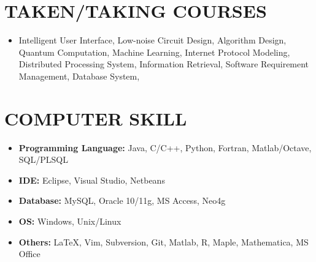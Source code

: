 \documentclass[margin]{res}
\begin{document}
\begin{resume}
\section{TAKEN/TAKING COURSES}
	\begin{itemize}
		\item Intelligent User Interface, Low-noise Circuit Design, Algorithm Design, Quantum Computation, Machine Learning, Internet Protocol Modeling, Distributed Processing System, Information Retrieval, Software Requirement Management, Database System, 
	\end{itemize}

\section{COMPUTER SKILL}             
	\begin{itemize}
		\item \textbf{Programming Language:} Java, C/C++, Python, Fortran, Matlab/Octave, SQL/PLSQL
		\item \textbf{IDE:} Eclipse, Visual Studio, Netbeans
		\item \textbf{Database:} MySQL, Oracle 10/11g, MS Access, Neo4g
		\item \textbf{OS:} Windows, Unix/Linux
		\item \textbf{Others:} LaTeX, Vim, Subversion, Git, Matlab, R, Maple, Mathematica, MS Office
	\end{itemize}
	
           

\end{resume}
\end{document}
